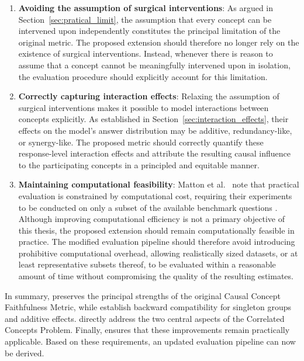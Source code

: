 \begin{enumerate}[
		label=\textbf{R\arabic*},
		ref=R\arabic*,
		wide=0pt,
		leftmargin=0pt
	]
	\item \label{req:no_surgical} \textbf{Avoiding the assumption of surgical interventions}:
	      As argued in Section~\ref{sec:pratical_limit}, the assumption that every concept can be intervened upon independently constitutes the principal limitation of the original metric. The proposed extension should therefore no longer rely on the existence of surgical interventions. Instead, whenever there is reason to assume that a concept cannot be meaningfully intervened upon in isolation, the evaluation procedure should explicitly account for this limitation.

	\item \label{req:caputure_interaction} \textbf{Correctly capturing interaction effects}:
	      Relaxing the assumption of surgical interventions makes it possible to model interactions between concepts explicitly. As established in Section~\ref{sec:interaction_effects}, their effects on the model's answer distribution may be additive, redundancy-like, or synergy-like. The proposed metric should correctly quantify these response-level interaction effects and attribute the resulting causal influence to the participating concepts in a principled and equitable manner.

	\item \label{req:feasibility} \textbf{Maintaining computational feasibility}:
	      Matton et al.~\cite{mattonWalkTalkMeasuring2024} note that practical evaluation is constrained by computational cost, requiring their experiments to be conducted on only a subset of the available benchmark questions \cite{mattonWalkTalkMeasuring2024}. Although improving computational efficiency is not a primary objective of this thesis, the proposed extension should remain computationally feasible in practice. The modified evaluation pipeline should therefore avoid introducing prohibitive computational overhead, allowing realistically sized datasets, or at least representative subsets thereof, to be evaluated within a reasonable amount of time without compromising the quality of the resulting estimates.
\end{enumerate}

In summary,  preserves the principal strengths of the original Causal Concept Faithfulness Metric, while  establish backward compatibility for singleton groups and additive effects.  directly address the two central aspects of the Correlated Concepts Problem. Finally,  ensures that these improvements remain practically applicable. Based on these requirements, an updated evaluation pipeline can now be derived.


